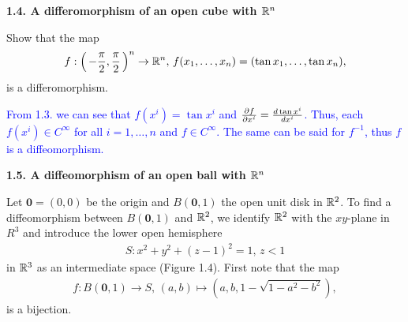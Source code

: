 \documentclass[10pt,a4paper]{report}
\newcommand{\BLUE}[1]{\textcolor{blue}{#1}}
\begin{document}
\noindent \textbf{1.4. A differomorphism of an open cube with $\mathbb{R}^n$}

\noindent Show that the map
\begin{align*}
	f:\left (\, -\frac{\pi}{2}, \frac{\pi}{2} \,\right )^n \to \mathbb{R}^n,\, f(x_1,\dots, x_n) = (\tan x_1, \dots, \tan x_n),
\end{align*}is a differomorphism.

\BLUE{From 1.3. we can see that $f(x^i) = \tan x^i$ and $\frac{\partial f}{\partial x^i} = \frac{d \tan x^i}{d x^i}$.  Thus, each $f(x^i) \in C^\infty$ for all $i=1,\dots,n$ and $f \in C^\infty$.  The same can be said for $f^{-1}$, thus $f$ is a diffeomorphism.\\
}

\noindent \textbf{1.5. A diffeomorphism of an open ball with $\mathbb{R}^n$}

\noindent Let $\textbf{0} = (0,0)$ be the origin and $B(\textbf{0}, 1)$ the open unit disk in $\mathbb{R}^2$.  To find a diffeomorphism between $B(\textbf{0},1)$ and $\mathbb{R}^2$, we identify $\mathbb{R}^2$ with the $xy$-plane in $R^3$ and introduce the lower open hemisphere
\begin{align*}
	S: x^2+y^2+(z-1)^2=1, \, z<1
\end{align*}in $\mathbb{R}^3$ as an intermediate space (Figure 1.4). First note that the map
\begin{align*}
	f: B(\textbf{0}, 1) \to S, \, (a,b) \mapsto(a,b,1-\sqrt{1-a^2-b^2}),
\end{align*}is a bijection.
\end{document}
